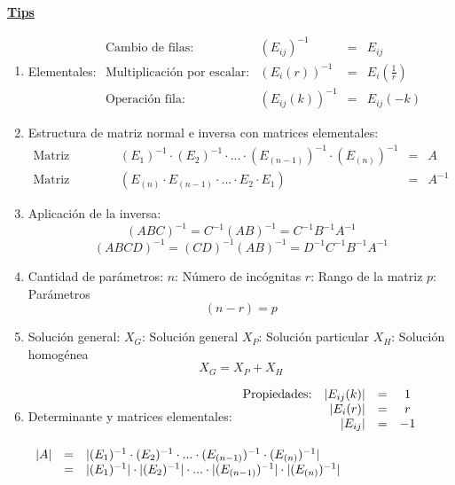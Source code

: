 \documentclass[12pt]{article}
\begin{document}
\pagebreak
\begin{center}
    \textbf{\underline{Tips}}
\end{center}
\begin{enumerate}
    \item Elementales:
          \subitem
          $\begin{array}{lrcl}
                  \mbox{Cambio de filas:}              & (E_{ij})^{-1}    & = & E_{ij}           \\
                  \mbox{Multiplicaci\'on por escalar:} & (E_i(r))^{-1}    & = & E_i(\frac{1}{r}) \\
                  \mbox{Operaci\'on fila:}             & (E_{ij}(k))^{-1} & = & E_{ij}(-k)
              \end{array}$
    \item Estructura de matriz normal e inversa con matrices elementales:
          \subitem
          $\begin{array}{lccl}
                  \mbox{Matriz normal:}  & (E_{1})^{-1}\cdot(E_{2})^{-1}\cdot...\cdot(E_{(n-1)})^{-1}\cdot(E_{(n)})^{-1} & = & A      \\
                  \mbox{Matriz inversa:} & (E_{(n)}\cdot E_{(n-1)}\cdot...\cdot E_{2}\cdot E_{1})                        & = & A^{-1}
              \end{array}$
    \item Aplicaci\'on de la inversa:
          $$(ABC)^{-1}=C^{-1}(AB)^{-1}=C^{-1}B^{-1}A^{-1}$$
          $$(ABCD)^{-1}=(CD)^{-1}(AB)^{-1}=D^{-1}C^{-1}B^{-1}A^{-1}$$
    \item Cantidad de par\'ametros:
          \subitem $n$: N\'umero de inc\'ognitas
          \subitem $r$: Rango de la matriz
          \subitem $p$: Par\'ametros
          $$(n-r)=p$$
    \item Soluci\'on general:
          \subitem $X_G$: Soluci\'on general
          \subitem $X_P$: Soluci\'on particular
          \subitem $X_H$: Soluci\'on homog\'enea
          $$X_G=X_P+X_H$$
    \item Determinante y matrices elementales:
          \subitem $\begin{array}[]{crcc}
                  \mbox{Propiedades:} & |E_{ij}(k)| & = & 1  \\
                                      & |E_{i}(r)|  & = & r  \\
                                      & |E_{ij}|    & = & -1 \\
                                      &             &   &
              \end{array}$
          \subitem $\begin{array}[]{lcl}
                  |A| & = & |(E_{1})^{-1}\cdot(E_{2})^{-1}\cdot...\cdot(E_{(n-1)})^{-1}\cdot(E_{(n)})^{-1}|       \\
                      & = & |(E_{1})^{-1}|\cdot|(E_{2})^{-1}|\cdot...\cdot|(E_{(n-1)})^{-1}|\cdot|(E_{(n)})^{-1}|
              \end{array}$
\end{enumerate}
\end{document}
